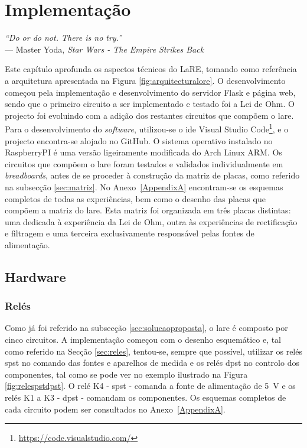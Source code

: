 \chapter{Implementação}
\label{Capítulo4}

\begin{flushright}
\textit{``Do or do not. There is no try.''} \\[0.5em]
--- Master Yoda, \textit{Star Wars - The Empire Strikes Back}
\end{flushright}


Este capítulo aprofunda os aspectos técnicos do LaRE, tomando como referência a arquitetura apresentada na Figura \ref{fig:arquitecturalore}. O desenvolvimento começou pela implementação e desenvolvimento do servidor Flask e página web, sendo que o primeiro circuito a ser implementado e testado foi a Lei de Ohm. O projecto foi evoluindo com a adição dos restantes circuitos que compõem o \acrshort{lare}. Para o desenvolvimento do \textit{software}, utilizou-se o \acrshort{ide} Visual Studio Code\footnote{\url{https://code.visualstudio.com/}}, e o projecto encontra-se alojado no GitHub. O sistema operativo instalado no \gls{RaspberryPI} é uma versão ligeiramente modificada do Arch Linux ARM. Os circuitos que compõem o \acrshort{lare} foram testados e validados individualmente em \textit{breadboards}, antes de se proceder à construção da matriz de placas, como referido na subsecção \ref{sec:matriz}. No Anexo~\ref{AppendixA} encontram-se os esquemas completos de todas as experiências, bem como o desenho das placas que compõem a matriz do \acrshort{lare}. Esta matriz foi organizada em três placas distintas: uma dedicada à experiência da Lei de Ohm, outra às experiências de rectificação e filtragem e uma terceira exclusivamente responsável pelas fontes de alimentação.

\section{Hardware}
\subsection{Relés}
\label{sec:hwreles}
Como já foi referido na subsecção \ref{sec:solucaoproposta}, o \acrshort{lare} é composto por cinco circuitos. A implementação começou com o desenho esquemático e, tal como referido na Secção \ref{sec:reles}, tentou-se, sempre que possível, utilizar os relés \acrshort{spst} no comando das fontes e aparelhos de medida e os relés \acrshort{dpst} no controlo dos componentes, tal como se pode ver no exemplo ilustrado na Figura \ref{fig:relespstdpst}. O relé K4 - \acrshort{spst} - comanda a fonte de alimentação de \SI{5}{\volt} e os relés K1 a K3 - \acrshort{dpst} - comandam os componentes. Os esquemas completos de cada circuito podem ser consultados no Anexo~\ref{AppendixA}.

